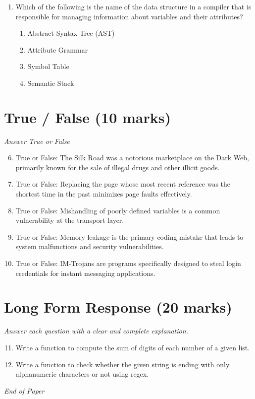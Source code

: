 \documentclass[12pt]{article}
\begin{document}
\begin{enumerate}[label=\arabic*.]
\begin{enumerate}[label=(\alph*)]
    \item Transceiver Station
\end{enumerate}
\item Which of the following is the name of the data structure in a compiler that is responsible for managing information about variables and their attributes?
\begin{enumerate}[label=(\alph*)]
    \item Abstract Syntax Tree (AST)
    \item Attribute Grammar
    \item Symbol Table
    \item Semantic Stack
\end{enumerate}
\end{enumerate}

\section*{True / False (10 marks)}
\textit{Answer True or False}
\begin{enumerate}[label=\arabic*.]
\setcounter{enumi}{5}
\item True or False: The Silk Road was a notorious marketplace on the Dark Web, primarily known for the sale of illegal drugs and other illicit goods.
\item True or False: Replacing the page whose most recent reference was the shortest time in the past minimizes page faults effectively.
\item True or False: Mishandling of poorly defined variables is a common vulnerability at the transport layer.
\item True or False: Memory leakage is the primary coding mistake that leads to system malfunctions and security vulnerabilities.
\item True or False: IM-Trojans are programs specifically designed to steal login credentials for instant messaging applications.
\end{enumerate}

\section*{Long Form Response (20 marks)}
\textit{Answer each question with a clear and complete explanation.}
\begin{enumerate}[label=\arabic*.]
\setcounter{enumi}{10}
\item Write a function to compute the sum of digits of each number of a given list.
\item Write a function to check whether the given string is ending with only alphanumeric characters or not using regex.
\end{enumerate}

\vfill
\noindent\textit{End of Paper}
\end{document}

